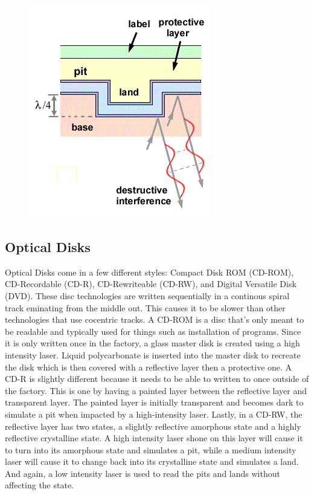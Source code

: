 \documentclass[ aip, 12pt]{revtex4-1} %
\begin{document}
\begin{figure}[H]
\centerline{\includegraphics[scale=.9]{cdRom.png}}
\caption{ }
\label{cdRom}
\end{figure} 
\subsection{Optical Disks}
Optical Disks come in a few different styles: Compact Disk ROM (CD-ROM), CD-Recordable (CD-R), CD-Rewriteable (CD-RW), and Digital Versatile Disk (DVD). These disc technologies are written sequentially in a continous spiral track eminating from the middle out. This causes it to be slower than other technologies that use cocentric tracks. A CD-ROM is a disc that's only meant to be readable and typically used for things such as installation of programs. Since it is only written once in the factory, a glass master disk is created using a high intensity laser. Liquid polycarbonate is inserted into the master disk to recreate the disk which is then covered with a reflective layer then a protective one. 
A CD-R is slightly different because it needs to be able to written to once outside of the factory. This is one by having a painted layer between the reflective layer and transparent layer. The painted layer is initially transparent and becomes dark to simulate a pit when impacted by a high-intensity laser. Lastly, in a CD-RW, the reflective layer has two states, a slightly reflective amorphous state and a highly reflective crystalline state. A high intensity laser shone on this layer will cause it to turn into its amorphous state and simulates a pit, while a medium intensity laser will cause it to change back into its crystalline state and simulates a land. And again, a low intensity laser is used to read the pits and lands without affecting the state.
\end{document}
